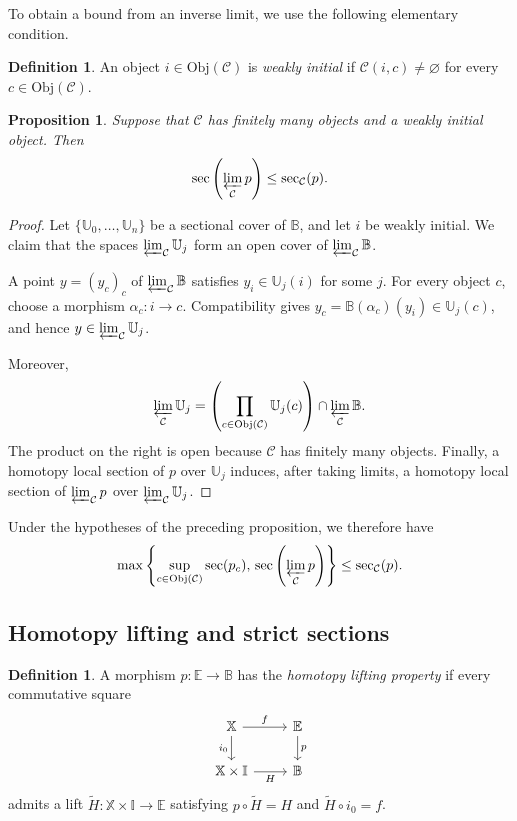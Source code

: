 \documentclass[12pt]{amsart}
\newtheorem{prop}[teo]{Proposition}
\theoremstyle{definition}
\newtheorem{defi}[teo]{Definition}
\theoremstyle{remark}
\numberwithin{figure}{section}%
\newcommand{\CC}{\mathcal{C}}
\newcommand{\X}{\mathbb{X}}
\newcommand{\Obj}{\mathrm{Obj}}
\newcommand{\Ee}{\mathbb{E}}
\newcommand{\Bb}{\mathbb{B}}
\newcommand{\Uu}{\mathbb{U}}
\begin{document}
To obtain a bound from an inverse limit, we use the following elementary
condition.

\begin{defi}
An object $i\in\Obj(\CC)$ is \emph{weakly initial} if
$\CC(i,c)\neq\varnothing$ for every $c\in\Obj(\CC)$.
\end{defi}

\begin{prop}\label{prop:sectional_category_limits}
Suppose that $\CC$ has finitely many objects and a weakly initial object.
Then
\[
\sec\left(\varprojlim_{\CC}p\right)
\leq
\sec_{\CC}(p).
\]
\end{prop}

\begin{proof}
Let $\{\Uu_0,\ldots,\Uu_n\}$ be a sectional cover of $\Bb$, and let
$i$ be weakly initial. We claim that the spaces
$\varprojlim_{\CC}\Uu_j$ form an open cover of
$\varprojlim_{\CC}\Bb$.

A point $y=(y_c)_c$ of $\varprojlim_{\CC}\Bb$ satisfies
$y_i\in\Uu_j(i)$ for some $j$. For every object $c$, choose a morphism
$\alpha_c\colon i\to c$. Compatibility gives
$y_c=\Bb(\alpha_c)(y_i)\in\Uu_j(c)$, and hence
$y\in\varprojlim_{\CC}\Uu_j$.

Moreover,
\[
\varprojlim_{\CC}\Uu_j
=
\left(\prod_{c\in\Obj(\CC)}\Uu_j(c)\right)
\cap
\varprojlim_{\CC}\Bb.
\]
The product on the right is open because $\CC$ has finitely many
objects. Finally, a homotopy local section of $p$ over $\Uu_j$ induces,
after taking limits, a homotopy local section of
$\varprojlim_{\CC}p$ over $\varprojlim_{\CC}\Uu_j$.
\end{proof}

Under the hypotheses of the preceding proposition, we therefore have
\[
\max\left\{
\sup_{c\in\Obj(\CC)}\sec(p_c),
\,
\sec\left(\varprojlim_{\CC}p\right)
\right\}
\leq
\sec_{\CC}(p).
\]

\subsection{Homotopy lifting and strict sections}

\begin{defi}\label{def:HLP-diagrams}
A morphism $p\colon\Ee\to\Bb$ has the \emph{homotopy lifting property}
if every commutative square
\[
\begin{tikzcd}
\X
  \arrow[r,"f"]
  \arrow[d,"i_0"']
&
\Ee
  \arrow[d,"p"]
\\
\X\times\mathbb I
  \arrow[r,"H"']
&
\Bb
\end{tikzcd}
\]
admits a lift $\widetilde H\colon\X\times\mathbb I\to\Ee$ satisfying
$p\circ\widetilde H=H$ and $\widetilde H\circ i_0=f$.
\end{defi}
\end{document}
